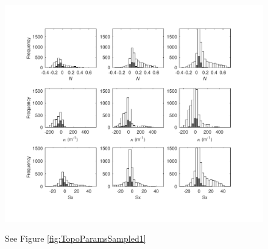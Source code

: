 \documentclass[twocolumn, letterpaper]{igs}
\begin{document}
\begin{figure}
	\centering
	\includegraphics[width =\textwidth]{TopoParamsSampled2.pdf}\\
	\caption{See Figure \ref{fig:TopoParamsSampled1}}
	\label{fig:TopoParamsSampled2}
\end{figure}

\end{document}
